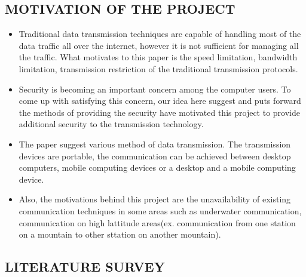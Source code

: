 \documentclass[12pt,a4paper]
{article}
\numberwithin{table}{section}
\begin{document}
{{{\subsection{MOTIVATION OF THE PROJECT}
\vspace{0.1 in} 
\begin{itemize}
\item	Traditional data transmission techniques are capable of handling most of the data traffic all over the internet, however it is not sufficient for managing all the traffic. What motivates to this paper is the speed limitation, bandwidth limitation, transmission restriction of the traditional transmission protocols. 
\item Security is becoming an important concern among the computer users. To come up with satisfying this concern, our idea here suggest and puts forward the methods of providing the security have motivated this project to provide additional security to the transmission technology.
\item The paper suggest various method of data transmission. The transmission devices are portable, the communication can be achieved between desktop computers, mobile computing devices or a desktop and a mobile computing device.
\item Also, the motivations behind this project are the unavailability of existing communication techniques in some areas such as underwater communication, communication on high lattitude areas(ex. communication from one station on a mountain to other sttation on another mountain).
\end{itemize}



\newpage
\subsection{LITERATURE SURVEY}

}}}
\end{document}
